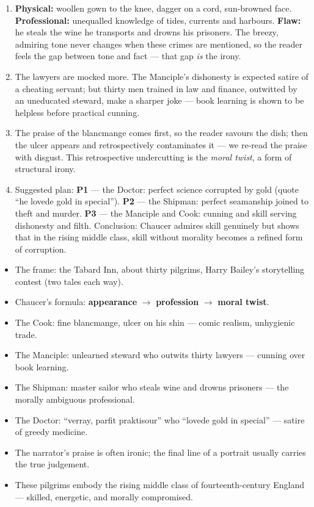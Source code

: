 \documentclass[11pt]{article}
\begin{document}
\begin{corrige}[Exercise 1]
\begin{enumerate}
\item \textbf{Physical:} woollen gown to the knee, dagger on a cord, sun-browned face. \textbf{Professional:} unequalled knowledge of tides, currents and harbours. \textbf{Flaw:} he steals the wine he transports and drowns his prisoners. The breezy, admiring tone never changes when these crimes are mentioned, so the reader feels the gap between tone and fact — that gap \emph{is} the irony.
\item The lawyers are mocked more. The Manciple's dishonesty is expected satire of a cheating servant; but thirty men trained in law and finance, outwitted by an uneducated steward, make a sharper joke — book learning is shown to be helpless before practical cunning.
\item The praise of the blancmange comes first, so the reader savours the dish; then the ulcer appears and retrospectively contaminates it — we re-read the praise with disgust. This retrospective undercutting is the \emph{moral twist}, a form of structural irony.
\item Suggested plan: \textbf{P1} — the Doctor: perfect science corrupted by gold (quote ``he lovede gold in special''). \textbf{P2} — the Shipman: perfect seamanship joined to theft and murder. \textbf{P3} — the Manciple and Cook: cunning and skill serving dishonesty and filth. Conclusion: Chaucer admires skill genuinely but shows that in the rising middle class, skill without morality becomes a refined form of corruption.
\end{enumerate}
\end{corrige}

\begin{aretenir}
\begin{itemize}
\item The frame: the Tabard Inn, about thirty pilgrims, Harry Bailey's storytelling contest (two tales each way).
\item Chaucer's formula: \textbf{appearance} $\rightarrow$ \textbf{profession} $\rightarrow$ \textbf{moral twist}.
\item The Cook: fine blancmange, ulcer on his shin — comic realism, unhygienic trade.
\item The Manciple: unlearned steward who outwits thirty lawyers — cunning over book learning.
\item The Shipman: master sailor who steals wine and drowns prisoners — the morally ambiguous professional.
\item The Doctor: ``verray, parfit praktisour'' who ``lovede gold in special'' — satire of greedy medicine.
\item The narrator's praise is often ironic; the final line of a portrait usually carries the true judgement.
\item These pilgrims embody the rising middle class of fourteenth-century England — skilled, energetic, and morally compromised.
\end{itemize}
\end{aretenir}
\end{document}
